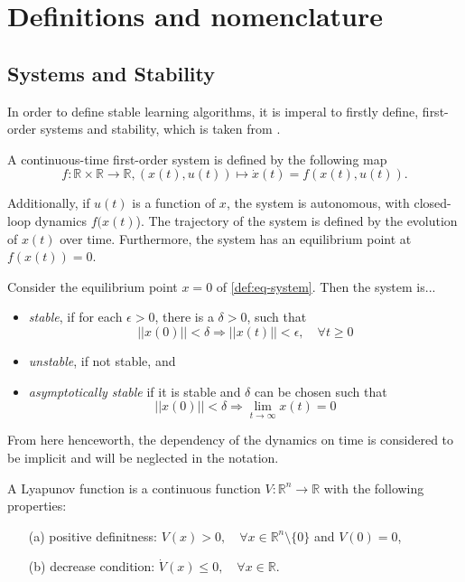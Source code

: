 \section{Definitions and nomenclature}
\label{sec:definitions}
\subsection{Systems and Stability}
In order to define stable learning algorithms, it is imperal to firstly define, first-order systems and stability, which is taken from \cite{khalilNonlinearSystems1996}.

\begin{definition}
    A continuous-time first-order system is defined by the following map
    \begin{equation}
        f:\mathbb{R}\times\mathbb{R}\rightarrow \mathbb{R}, (x(t),u(t)) \mapsto \dot x(t) = f(x(t),u(t)).
        \label{def:eq-system}
    \end{equation}

    Additionally, if $u(t)$ is a function of $x$, the system is autonomous, with closed-loop dynamics $f(x(t)$). The trajectory of the system is defined by the evolution of $x(t)$ over time. Furthermore, the system has an equilibrium point at $f(x(t))=0$.
    \label{def:system}
\end{definition}

\begin{definition}[Stability]
    Consider the equilibrium point $x=0$ of \eqref{def:eq-system}. Then the system is... 
    \begin{itemize}
        \item \textit{stable}, if for each $\epsilon>0$, there is a $\delta>0$, such that
            $$||x(0)||<\delta \Rightarrow ||x(t)||<\epsilon, \quad \forall t \geq 0$$ 
        \item \textit{unstable}, if not stable, and
        \item \textit{asymptotically stable} if it is stable and $\delta$ can be chosen such that
            $$||x(0)||<\delta \Rightarrow \lim_{t\rightarrow\infty} x(t)=0 $$
    \end{itemize} 
\end{definition}
From here henceworth, the dependency of the dynamics on time is considered to be implicit and will be neglected in the notation.


\begin{definition}
    A Lyapunov function is a continuous function $V: \mathbb{R}^n\rightarrow\mathbb{R}$ with the following properties:
    \begin{enumerate}
        \item[(a)] positive definitness: $V(x)>0, \quad \forall x\in\mathbb{R}^n\setminus\{0\}$ and $V(0)=0$,
        \item[(b)] decrease condition: $\dot V(x)\leq0, \quad \forall x\in\mathbb{R}$.
    \end{enumerate}
\end{definition}

